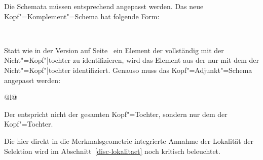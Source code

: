 \noindent
Die Schemata müssen entsprechend angepasst werden. Das neue Kopf"=Komplement"=Schema
hat folgende Form:
\begin{schema}
\label{schema-head-arg}
 \impl\\
\end{schema}
Statt wie in der Version auf Seite~\pageref{schema-Kopf-Komplementschema-prel2} ein Element
der \compsl vollständig mit der Nicht"=Kopf"|tochter zu identifizieren, wird
das Element aus der \compsl nur mit dem \synsemw der Nicht"=Kopf"|tochter identifiziert.
Genauso muss das Kopf"=Adjunkt"=Schema angepasst werden:
\begin{schema}
\label{ha-schema-final}
\begin{tabular}[t]{@{}l@{}}
 \impl\\
\end{tabular}
\end{schema}
Der \modw entspricht nicht der gesamten Kopf"=Tochter, sondern nur dem \synsemw der Kopf"=Tochter.

Die hier direkt in die Merkmalsgeometrie integrierte Annahme der Lokalität der Selektion
wird im Abschnitt~\ref{disc-lokalitaet} noch kritisch beleuchtet.


